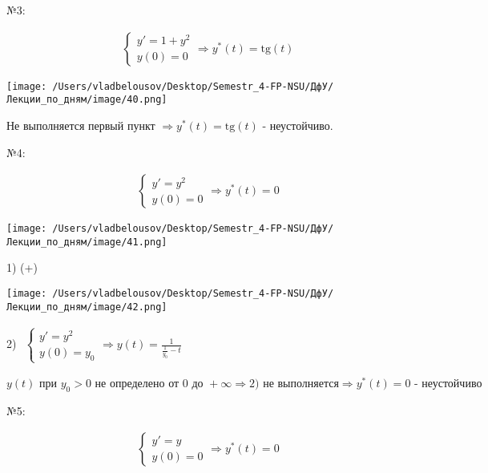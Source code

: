 \documentclass[12pt, a4paper]{report}
\begin{document}
№3: 

\[\begin{aligned}
    \begin{cases}
        y ' = 1 + y ^2 \\ 
        y(0 ) = 0
    \end{cases} 
    \Rightarrow y^* (t ) = \mathrm{tg }  (t ) 
\end{aligned}\] 

\begin{center}
    \texttt{[image: /Users/vladbelousov/Desktop/Semestr\_4-FP-NSU/ДфУ/Лекции\_по\_дням/image/40.png]}
\end{center}

Не выполняется первый пункт \( \Rightarrow y^*(t ) = \mathrm{tg } (t ) \)  - неустойчиво. 

№4: 

\[ \begin{aligned}
    \begin{cases}
        y ' = y ^2 \\ 
        y(0 ) = 0
    \end{cases}
    \Rightarrow y^* (t ) = 0
\end{aligned} \] 

\begin{center}
    \texttt{[image: /Users/vladbelousov/Desktop/Semestr\_4-FP-NSU/ДфУ/Лекции\_по\_дням/image/41.png]}
\end{center}

1) (+) \\

\begin{center}
    \texttt{[image: /Users/vladbelousov/Desktop/Semestr\_4-FP-NSU/ДфУ/Лекции\_по\_дням/image/42.png]}
\end{center}

2) \( \begin{aligned}
\begin{cases}
    y' = y ^2 \\ 
    y(0 ) = y_0
\end{cases}
\Rightarrow y(t ) = \frac{1}{\displaystyle  \frac{1}{y_0 } -t  } 
\end{aligned} \) 

\[ y(t ) \text{ при }  y_0> 0 \text{ не определено от } 0 \text{ до }  + \infty   \Rightarrow 2) \text{ не выполняется}\Rightarrow y^{* } (t )= 0 \text{ - неустойчиво}  \] 

№5: 

\[ \begin{aligned}
\begin{cases}
y ' = y \\ 
y(0 ) = 0 
\end{cases}
\Rightarrow y^* (t ) = 0
\end{aligned} \] 
\end{document}
